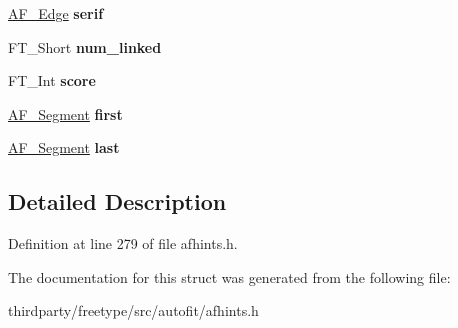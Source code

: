 \begin{DoxyCompactItemize}
\hyperlink{struct_a_f___edge_rec__}{A\+F\+\_\+\+Edge} {\bfseries serif}
\item 
\mbox{\label{struct_a_f___edge_rec___a4702f6c88e75d76882ff213e0f715010}} 
F\+T\+\_\+\+Short {\bfseries num\+\_\+linked}
\item 
\mbox{\label{struct_a_f___edge_rec___a7c399340f7574ef8a570bcb90882f1f1}} 
F\+T\+\_\+\+Int {\bfseries score}
\item 
\mbox{\label{struct_a_f___edge_rec___a57614243a3a4d8cebd088d7c9cbc80af}} 
\hyperlink{struct_a_f___segment_rec__}{A\+F\+\_\+\+Segment} {\bfseries first}
\item 
\mbox{\label{struct_a_f___edge_rec___a68730a288fd588ada62778918d563696}} 
\hyperlink{struct_a_f___segment_rec__}{A\+F\+\_\+\+Segment} {\bfseries last}
\end{DoxyCompactItemize}


\subsection{Detailed Description}


Definition at line 279 of file afhints.\+h.



The documentation for this struct was generated from the following file\+:\begin{DoxyCompactItemize}
\item 
thirdparty/freetype/src/autofit/afhints.\+h\end{DoxyCompactItemize}

